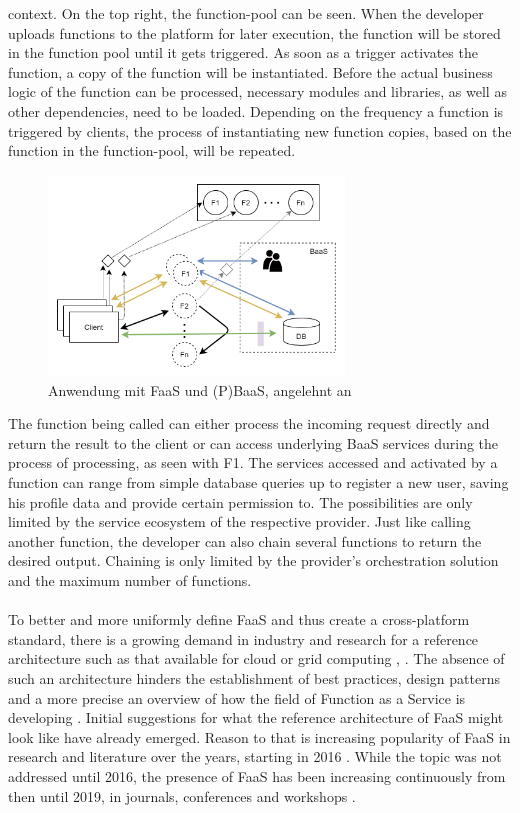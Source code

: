 \documentclass[a4paper,twoside,11pt, pagesize]{scrartcl}
\begin{document}
\begin{spacing}{1.2}
context. On the top right, the function-pool can be seen. When the developer uploads functions to the platform for later execution, the function will be stored in the function pool until it gets triggered. As soon as a trigger activates the function, a copy of the function will be instantiated. Before the actual business logic of the function can be processed, necessary modules and libraries, as well as other dependencies, need to be loaded. Depending on the frequency a function is triggered by clients, the process of instantiating new function copies, based on the function in the function-pool, will be repeated.    
\begin{figure}[H]
\label{fig:FaaSBaaSExample}
\centering
\includegraphics[width=0.7\textwidth]{FaaS}
\caption{Anwendung mit FaaS und (P)BaaS, angelehnt an \cite{shafiei2020serverless}}
\end{figure}
The function being called can either process the incoming request directly and return the result to the client or can access underlying BaaS services during the process of processing, as seen with F1. The services accessed and activated by a function can range from simple database queries up to register a new user, saving his profile data and provide certain permission to. The possibilities are only limited by the service ecosystem of the respective provider. Just like calling another function, the developer can also chain several functions to return the desired output. Chaining is only limited by the provider's orchestration solution and the maximum number of functions.\\\\ To better and more uniformly define FaaS and thus create a cross-platform standard, there is a growing demand in industry and research for a reference architecture such as that available for cloud or grid computing \cite{liu2011nist}, \cite{foster2003grid}. The absence of such an architecture hinders the establishment of best practices, design patterns and a more precise an overview of how the field of Function as a Service is developing \cite{leitner2019mixed}. Initial suggestions for what the reference architecture of FaaS might look like have already emerged. Reason to that is increasing popularity of FaaS in research and literature over the years, starting in 2016  \cite{van2019spec}. While the topic was not addressed until 2016, the presence of FaaS has been increasing continuously from then until 2019, in journals, conferences and workshops \cite{Yussupov2019_SystematicMappingStudyFaaS}.

\end{spacing}
\end{document}
